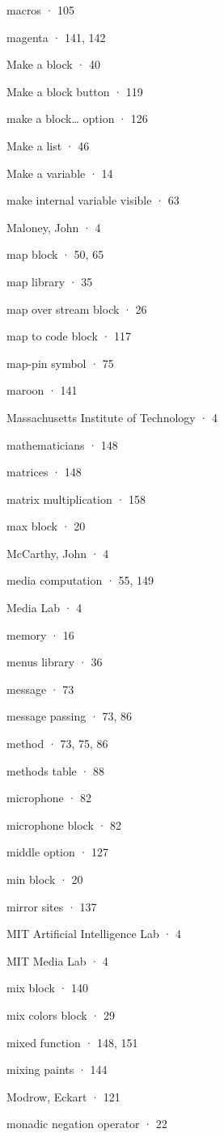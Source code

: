 macros · 105

magenta · 141, 142

Make a block · 40

Make a block button · 119

make a block\ldots{} option · 126

Make a list · 46

Make a variable · 14

make internal variable visible · 63

Maloney, John · 4

map block · 50, 65

map library · 35

map over stream block · 26

map to code block · 117

map-pin symbol · 75

maroon · 141

Massachusetts Institute of Technology · 4

mathematicians · 148

matrices · 148

matrix multiplication · 158

max block · 20

McCarthy, John · 4

media computation · 55, 149

Media Lab · 4

memory · 16

menus library · 36

message · 73

message passing · 73, 86

method · 73, 75, 86

methods table · 88

microphone · 82

microphone block · 82

middle option · 127

min block · 20

mirror sites · 137

MIT Artificial Intelligence Lab · 4

MIT Media Lab · 4

mix block · 140

mix colors block · 29

mixed function · 148, 151

mixing paints · 144

Modrow, Eckart · 121

monadic negation operator · 22


